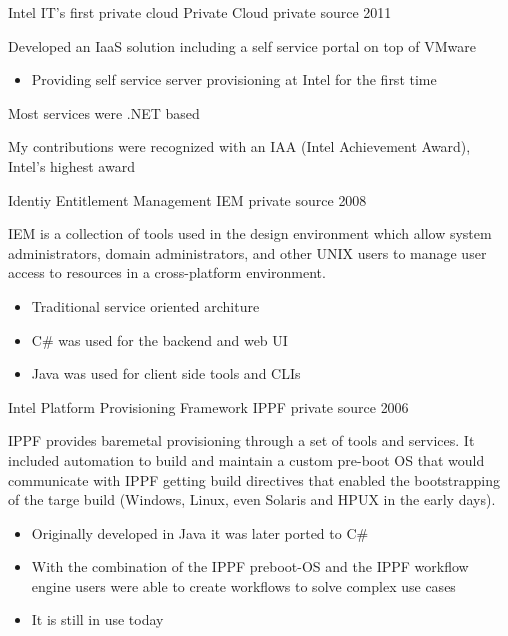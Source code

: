 \begin{cventries}
	\cventry
		{Intel IT's first private cloud}
		{Private Cloud}
		{private source}
		{2011}
		{
		\begin{cvitems}
			\item {Developed an IaaS solution including a self service portal on top of VMware}
			\begin{itemize} 
				\item {Providing self service server provisioning at Intel for the first time}
			\end{itemize}
			\item {Most services were .NET based}
			\item {My contributions were recognized with an IAA (Intel Achievement Award), Intel's highest award}			
		\end{cvitems}
		}
	
	\cventry
		{Identiy Entitlement Management}
		{IEM}
		{private source}
		{2008}
		{
			IEM is a collection of tools used in the design environment which allow system administrators, domain administrators, and other UNIX users to manage user access to resources in a cross-platform environment.
			\begin{itemize}
			\item {Traditional service oriented architure}
			\item {C\# was used for the backend and web UI}
			\item {Java was used for client side tools and CLIs}
			\end{itemize}
		}

	\cventry
		{Intel Platform Provisioning Framework}
		{IPPF}
		{private source}
		{2006}
		{
			IPPF provides baremetal provisioning through a set of tools and services.  It included automation to build and maintain a custom pre-boot OS that would communicate with IPPF getting build directives that enabled the bootstrapping of the targe build (Windows, Linux, even Solaris and HPUX in the early days). 
			\begin{itemize}
				\item {Originally developed in Java it was later ported to C\#}		
				\item {With the combination of the IPPF preboot-OS and the IPPF workflow engine users were able to create workflows to solve complex use cases}				
				\item {It is still in use today}
			\end{itemize}
		}
\end{cventries}


